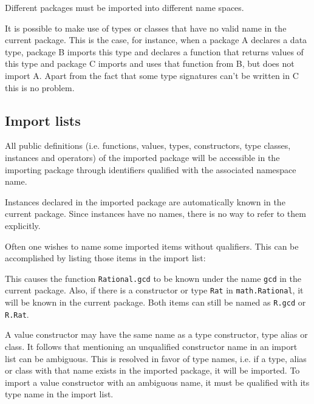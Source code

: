 
Different packages must be imported into different name spaces.

It is possible to make use of types or classes that have no valid name in the current package. 
This is the case, for instance, when a package A declares a data type, 
package B imports this type and declares a function that returns values of this type 
and package C imports and uses that function from B, but does not import A. 
Apart from the fact that some type signatures can't be written in C this is no problem.

\subsection{Import lists}

All public definitions (i.e. functions, values, types, constructors,
type classes, instances and operators) of the imported package will be accessible in
the importing package through identifiers qualified with the associated
namespace name.

Instances declared in the imported package are automatically known in the current package. Since instances have no names, there is no way to refer to them explicitly.

Often one wishes to name some imported items without qualifiers. This
can be accomplished by listing those items in the import list:


This causes the function {\tt Rational.gcd} to be known under the
name {\tt gcd} in the current package. Also, if there is a constructor
or type {\tt Rat} in {\tt math.Rational}, it will be known in the
current package. Both items can still be named as {\tt R.gcd} or {\tt
R.Rat}.

A value constructor may have the same name as a type constructor, type alias or class. It follows that mentioning an unqualified constructor name in an import list can be ambiguous. This is resolved in favor of type names, i.e. if a type, alias  or class with that name exists in the imported package, it will be imported. To import a value constructor with an ambiguous name, it must be qualified with its type name in the import list.


